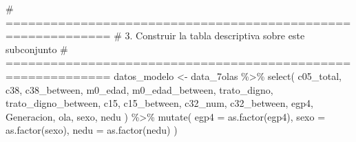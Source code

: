 \documentclass[
  spanish,
  a4paper,
  oneside]{scrbook}
\newenvironment{Shaded}{\begin{snugshade}}{\end{snugshade}}
\newcommand{\AttributeTok}[1]{\textcolor[rgb]{0.40,0.45,0.13}{#1}}
\newcommand{\CommentTok}[1]{\textcolor[rgb]{0.37,0.37,0.37}{#1}}
\newcommand{\FunctionTok}[1]{\textcolor[rgb]{0.28,0.35,0.67}{#1}}
\newcommand{\NormalTok}[1]{\textcolor[rgb]{0.00,0.23,0.31}{#1}}
\newcommand{\OtherTok}[1]{\textcolor[rgb]{0.00,0.23,0.31}{#1}}
\newcommand{\SpecialCharTok}[1]{\textcolor[rgb]{0.37,0.37,0.37}{#1}}
\begin{document}
\begin{Shaded}
\begin{Highlighting}[]
\CommentTok{\# ============================================================}
\CommentTok{\# 3. Construir la tabla descriptiva sobre este subconjunto}
\CommentTok{\# ============================================================}
\NormalTok{datos\_modelo }\OtherTok{\textless{}{-}}\NormalTok{ data\_7olas }\SpecialCharTok{\%\textgreater{}\%}
  \FunctionTok{select}\NormalTok{(}
\NormalTok{    c05\_total,}
\NormalTok{    c38, c38\_between,}
\NormalTok{    m0\_edad, m0\_edad\_between,}
\NormalTok{    trato\_digno, trato\_digno\_between,}
\NormalTok{    c15, c15\_between,}
\NormalTok{    c32\_num, c32\_between,}
\NormalTok{    egp4, Generacion, ola, sexo, nedu}
\NormalTok{  ) }\SpecialCharTok{\%\textgreater{}\%}
  \FunctionTok{mutate}\NormalTok{(}
    \AttributeTok{egp4 =} \FunctionTok{as.factor}\NormalTok{(egp4),}
    \AttributeTok{sexo =} \FunctionTok{as.factor}\NormalTok{(sexo),}
    \AttributeTok{nedu =} \FunctionTok{as.factor}\NormalTok{(nedu)}
\NormalTok{  )}


\end{Highlighting}
\end{Shaded}
\end{document}
